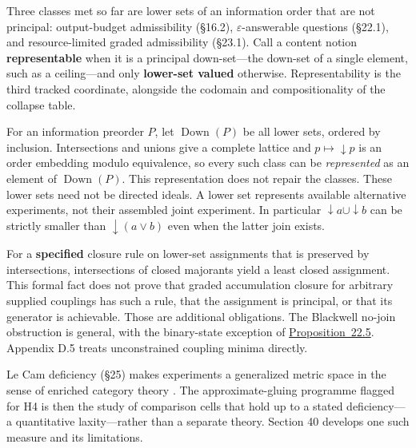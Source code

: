 \begin{thmrem}

Three classes met so far are lower sets of an information order that are not principal: output-budget admissibility (§16.2), \(\varepsilon\)-answerable questions (§22.1), and resource-limited graded admissibility (§23.1). Call a content notion \textbf{representable} when it is a principal down-set---\hspace{0pt}the down-set of a single element, such as a ceiling---\hspace{0pt}and only \textbf{lower-set valued} otherwise. Representability is the third tracked coordinate, alongside the codomain and compositionality of the collapse table.

For an information preorder \(P\), let \(\operatorname{Down}(P)\) be all lower sets, ordered by inclusion. Intersections and unions give a complete lattice and \(p\mapsto{\downarrow}p\) is an order embedding modulo equivalence, so every such class can be \emph{represented} as an element of \(\operatorname{Down}(P)\). This representation does not repair the classes. These lower sets need not be directed ideals. A lower set represents available alternative experiments, not their assembled joint experiment. In particular \({\downarrow}a\cup{\downarrow}b\) can be strictly smaller than \({\downarrow}(a\vee b)\) even when the latter join exists.

For a \textbf{specified} closure rule on lower-set assignments that is preserved by intersections, intersections of closed majorants yield a least closed assignment. This formal fact does not prove that graded accumulation closure for arbitrary supplied couplings has such a rule, that the assignment is principal, or that its generator is achievable. Those are additional obligations. The Blackwell no-join obstruction is general, with the binary-state exception of \hyperlink{stmt:22.5}{Proposition~22.5}. Appendix D.5 treats unconstrained coupling minima directly.
\end{thmrem}

\begin{thmrem}

Le Cam deficiency (§25) makes experiments a generalized metric space in the sense of enriched category theory \autocite{lawvere1973,lecam1964}. The approximate-gluing programme flagged for H4 is then the study of comparison cells that hold up to a stated deficiency---\hspace{0pt}a quantitative laxity---\hspace{0pt}rather than a separate theory. Section 40 develops one such measure and its limitations.
\end{thmrem}

